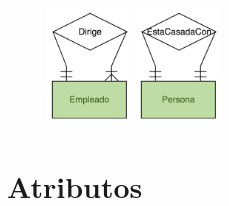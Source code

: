 \documentclass[12pt, fleqn]{report}                             %
\begin{document}
                \begin{figure}[h]
                    \includegraphics[width=0.20\textwidth]{RelacionUnaria}
                    \includegraphics[width=0.20\textwidth]{RelacionUnaria2}
                \end{figure}


        \clearpage
        \section{Atributos}
\end{document}
